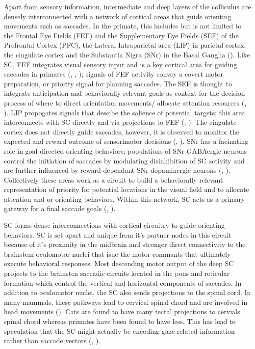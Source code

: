 \documentclass{ar-1col}
\begin{document}
{Apart from sensory information, intermediate and deep layers of the colliculus are densely interconnected with a network of cortical areas that guide orienting movements such as saccades. In the primate, this includes but is not limited to the Frontal Eye Fields (FEF) and the Supplementary Eye Fields (SEF) of the Prefrontal Cortex (PFC), the Lateral Intraparietal area (LIP) in parietal cortex, the cingulate cortex and the Substantia Nigra (SNr) in the Basal Ganglia (\cite{platt2003situating}). Like SC, FEF integrates visual sensory input and is a key cortical area for guiding saccades in primates (\cite{hanes2001interaction}, \cite{schall1999neural}, \cite{schall2002neural}); signals of FEF activity convey a covert motor preparation, or priority signal for planning saccades. The SEF is thought to integrate anticipation and behaviorally relevant goals as context for the decision process of where to direct orientation movements/ allocate attention resources (\cite{schall1991neuronal}, \cite{roesch2003impact}). LIP propogates signals that descibe the salience of potential targets; this area interconnects with SC directly and via projections to FEF (\cite{gottlieb1998representation}, \cite{goldberg2006saccades}). The cingulate cortex does not directly guide saccades, however, it is observed to monitor the expected and reward outcome of sensorimotor decisions (\cite{carter1998anterior}, \cite{ito2003performance}). SNr has a facinating role in goal-directed orienting behaviors; populations of SNr GABAergic neurons control the initiation of saccades by modulating disinhibition of SC activity and are further influenced by reward-dependant SNr dopaminergic neurons (\cite{@hikosaka2000role}, \cite{hikosaka2007basal}). Collectively these areas work as a circuit to build a behaviorally relevant representation of priority for potential locations in the visual field and to allocate attention and or orienting behaviors. Within this network, SC acts as a primary gateway for a final saccade goals (\cite{@fecteau2006salience}, \cite{bisley2019neural}).

SC forms dense interconnections with cortical circuitry to guide orienting behaviors. SC is set apart and unique from it's partner nodes in this circuit because of it's proximity in the midbrain and stronger direct connectivity to the brainstem oculomotor nuclei that isue the motor commants that ultimately execute behavioral responses. Most descending motor output of the deep SC projects to the brainsten saccadic circuits located in the pons and reticular formation which control the vertical and horizontal components of saccades. In addition to oculomotor nuclei, the SC also sends projections to the spinal cord. In many mammals, these pathways lead to cervical spinal chord and are involved in head movements (\cite{@may2006mammalian}). Cats are found to have many tectal projections to cervials spinal chord whereas primates have been found to have less. This has lead to speculation that the SC might actually be encoding gaze-related information rather than saccade vectors (\cite{freedman1997eye}, \cite{sparks200412}).

}
\end{document}
